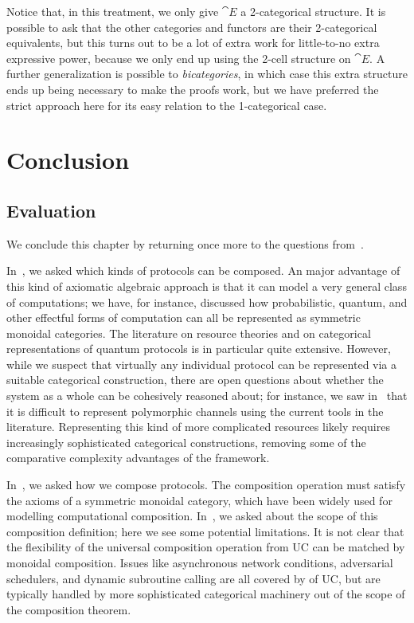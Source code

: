 Notice that, in this treatment, we only give $\cat{E}$ a 2-categorical
structure. It is possible to ask that the other categories and functors are
their 2-categorical equivalents, but this turns out to be a lot of extra work
for little-to-no extra expressive power, because we only end up using the 2-cell
structure on $\cat{E}$. A further generalization is possible to
\emph{bicategories}, in which case this extra structure ends up being necessary
to make the proofs work, but we have preferred the strict approach here for its
easy relation to the 1-categorical case.

\section{Conclusion}
\subsection{Evaluation}
\label{sec:evaluation}

We conclude this chapter by returning once more to the questions
from~. 

In~, we asked which kinds of protocols can be
composed. An major advantage of this kind of axiomatic algebraic approach is
that it can model a very general class of computations; we have, for instance,
discussed how probabilistic, quantum, and other effectful forms of computation
can all be represented as symmetric monoidal categories. The literature on
resource theories and on categorical representations of quantum protocols is in
particular quite extensive. However, while we suspect that virtually any
individual protocol can be represented via a suitable categorical construction,
there are open questions about whether the system as a whole can be cohesively
reasoned about; for instance, we saw in~
that it is difficult to represent polymorphic channels using the current tools
in the literature. Representing this kind of more complicated resources likely
requires increasingly sophisticated categorical constructions, removing some of
the comparative complexity advantages of the framework.

In~, we asked how we compose protocols. The
composition operation must satisfy the axioms of a symmetric monoidal category,
which have been widely used for modelling computational composition.
In~, we asked about the scope of this
composition definition; here we see some potential limitations. It is not clear
that the flexibility of the universal composition operation from UC can be
matched by monoidal composition. Issues like asynchronous network conditions,
adversarial schedulers, and dynamic subroutine calling are all covered by
of UC, but are typically handled by more sophisticated categorical machinery out
of the scope of the composition theorem.

